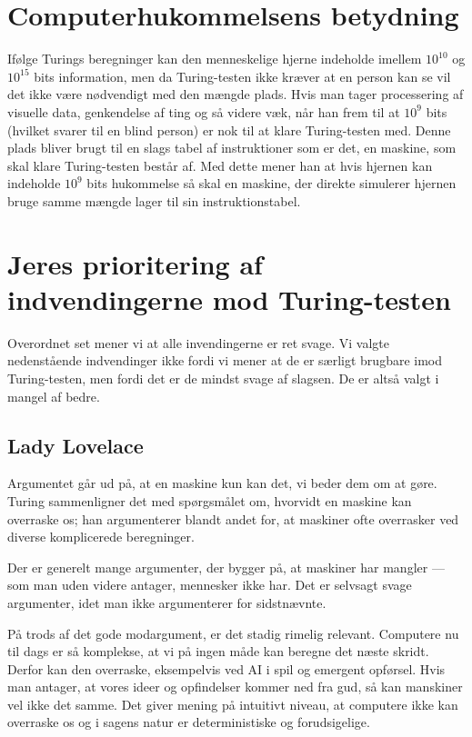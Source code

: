 \documentclass{article}
\begin{document}
\section{Computerhukommelsens betydning}
Ifølge Turings beregninger kan den menneskelige hjerne indeholde imellem $10^{10}$ og $10^{15}$ bits information, men da Turing-testen ikke kræver at en person kan se vil det ikke være nødvendigt med den mængde plads. Hvis man tager processering af visuelle data, genkendelse af ting og så videre væk, når han frem til at $10^9$ bits (hvilket svarer til en blind person) er nok til at klare Turing-testen med. Denne plads bliver brugt til en slags tabel af instruktioner som er det, en maskine, som skal klare Turing-testen består af. Med dette mener han at hvis hjernen kan indeholde $10^9$ bits hukommelse så skal en maskine, der direkte simulerer hjernen bruge samme mængde lager til sin instruktionstabel.

\section{Jeres prioritering af indvendingerne mod Turing-testen}
Overordnet set mener vi at alle invendingerne er ret svage. Vi valgte nedenstående indvendinger ikke fordi vi mener at de er særligt brugbare imod Turing-testen, men fordi det er de mindst svage af slagsen. De er altså valgt i mangel af bedre. %
\subsection{Lady Lovelace}
Argumentet går ud på, at en maskine kun kan det, vi beder dem om at gøre. Turing sammenligner det med spørgsmålet om, hvorvidt en maskine kan overraske os; han argumenterer blandt andet for, at maskiner ofte overrasker ved diverse komplicerede beregninger.

Der er generelt mange argumenter, der bygger på, at maskiner har mangler --- som man uden videre antager, mennesker ikke har. Det er selvsagt svage argumenter, idet man ikke argumenterer for sidstnævnte.

På trods af det gode modargument, er det stadig rimelig relevant. Computere nu til dags er så komplekse, at vi på ingen måde kan beregne det næste skridt. Derfor kan den overraske, eksempelvis ved AI i spil og emergent opførsel. Hvis man antager, at vores ideer og opfindelser kommer ned fra gud, så kan manskiner vel ikke det samme. Det giver mening på intuitivt niveau, at computere ikke kan overraske os og i sagens natur er deterministiske og forudsigelige.
\end{document}

